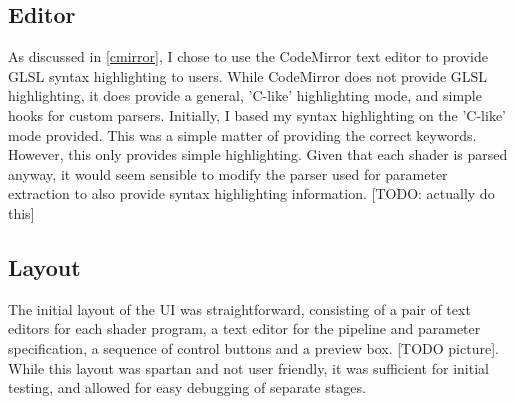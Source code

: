\documentclass[12pt,twoside,notitlepage]{report}
\begin{document}
\subsection{Editor}
As discussed in \ref{cmirror}, I chose to use the CodeMirror text editor to provide GLSL syntax highlighting to users. While CodeMirror does not provide GLSL highlighting, it does provide a general, 'C-like' highlighting mode, and simple hooks for custom parsers. Initially, I based my syntax highlighting on the 'C-like' mode provided. This was a simple matter of providing the correct keywords. However, this only provides simple highlighting. Given that each shader is parsed anyway, it would seem sensible to modify the parser used for parameter extraction to also provide syntax highlighting information. [TODO: actually do this]

\subsection{Layout}
The initial layout of the UI was straightforward, consisting of a pair of text editors for each shader program, a text editor for the pipeline and parameter specification, a sequence of control buttons and a preview box. [TODO picture]. While this layout was spartan and not user friendly, it was sufficient for initial testing, and allowed for easy debugging of separate stages.
\end{document}
